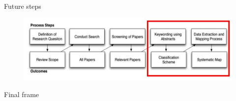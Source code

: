 \documentclass{beamer}
\begin{document}
\begin{frame}{Future steps}
\begin{figure}
	\includegraphics[width=1.0\textwidth]{sms_part_marked_2}
\end{figure}
\end{frame}

\begin{frame}
\begin{center}
	\huge{Final frame}
\end{center}
\end{frame}
\end{document}
